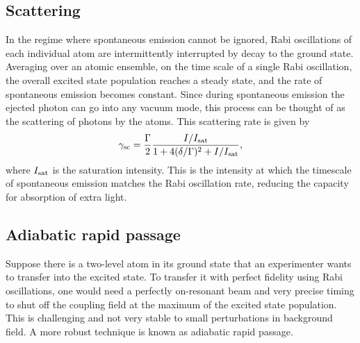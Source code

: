 \subsection{Scattering}\label{sec:scattering}
In the regime where spontaneous emission cannot be ignored, Rabi oscillations of each individual atom are intermittently interrupted by decay to the ground state. Averaging over an atomic ensemble, on the time scale of a single Rabi oscillation, the overall excited state population reaches a steady state, and the rate of spontaneous emission becomes constant. Since during spontaneous emission the ejected photon can go into any vacuum mode, this process can be thought of as the scattering of photons by the atoms. This scattering rate is given by\cite{LCT}
\begin{equation}
\gamma_{\rm{sc}}= \frac{\Gamma}{2} \frac{I/I_{\rm{sat}}}{1+4(\delta/\Gamma)^2 +I/I_{\rm{sat}}},
\label{eq:scatrate}
\end{equation}
where $I_{\rm{sat}}$ is the saturation intensity. This is the intensity at which the timescale of spontaneous emission matches the Rabi oscillation rate, reducing the capacity for absorption of extra light.   

\subsection{Adiabatic rapid passage}\label{sec:ARP}

Suppose there is a two-level atom in its ground state that an experimenter wants to transfer into the excited state. To transfer it with perfect fidelity using Rabi oscillations, one would need a perfectly on-resonant beam and very precise timing to shut off the coupling field at the maximum of the excited state population. This is challenging and not very stable to small perturbations in background field. A more robust technique is known as adiabatic rapid passage. 

